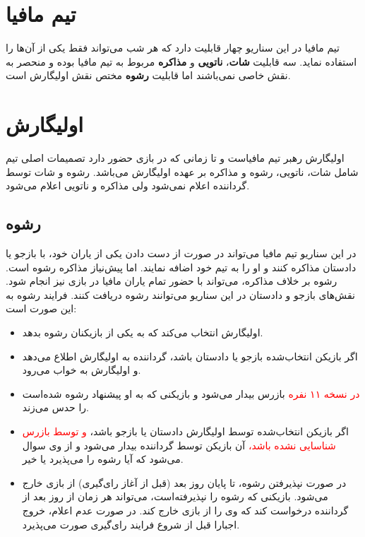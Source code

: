 \documentclass[12pt]{extarticle}
\begin{document}
\clearpage
{}

\section*{تیم مافیا}
تیم مافیا در این سناریو چهار قابلیت دارد که هر شب می‌تواند فقط یکی از آن‌ها را استفاده نماید. سه قابلیت
\textbf{شات}،
\textbf{ناتویی}
و
\textbf{مذاکره}
مربوط به تیم مافیا بوده و منحصر به نقش خاصی نمی‌باشند اما قابلیت
\textbf{رشوه}
مختص نقش اولیگارش است.

\section{اولیگارش}
اولیگارش رهبر تیم مافیاست و تا زمانی که در بازی حضور دارد تصمیمات اصلی تیم شامل شات، ناتویی، رشوه و مذاکره بر عهده اولیگارش می‌باشد.
رشوه و شات توسط گرداننده اعلام نمی‌شود ولی مذاکره و ناتویی اعلام می‌شود.

\subsection{رشوه}
در این سناریو تیم مافیا می‌تواند در صورت از دست دادن یکی از یاران خود، با بازجو یا دادستان مذاکره کنند و او را به تیم خود اضافه نمایند. اما پیش‌نیاز مذاکره‌ رشوه است. رشوه بر خلاف مذاکره، می‌تواند با حضور تمام یاران مافیا در بازی نیز انجام شود. نقش‌های بازجو و دادستان در این سناریو می‌توانند رشوه دریافت کنند. فرایند رشوه به این صورت است:
\begin{itemize}
	\item
	      اولیگارش انتخاب می‌کند که به یکی از بازیکنان رشوه بدهد.
	\item
	      اگر بازیکن انتخاب‌شده بازجو یا دادستان باشد، گرداننده به اولیگارش اطلاع می‌دهد و اولیگارش به خواب می‌رود.
	\item
	      \textcolor{red}{
		      در نسخه ۱۱ نفره
	      }
	      بازرس بیدار می‌شود و بازیکنی که به او پیشنهاد رشوه شده‌است را حدس می‌زند.
	\item
	      اگر بازیکن انتخاب‌شده توسط اولیگارش دادستان یا بازجو باشد،
	      \textcolor{red}{
		      و توسط بازرس شناسایی نشده باشد،
	      }
	      آن بازیکن توسط گرداننده بیدار می‌شود و از وی سوال می‌شود که آیا رشوه را می‌پذیرد یا خیر.
	\item
	      در صورت نپذیرفتن رشوه، تا پایان روز بعد (قبل از آغاز رای‌گیری) از بازی خارج می‌شود. بازیکنی که رشوه را نپذیرفته‌است، می‌تواند هر زمان از روز بعد از گرداننده درخواست کند که وی را از بازی خارج کند. در صورت عدم اعلام، خروج اجبارا قبل از شروع فرایند رای‌گیری صورت می‌پذیرد.
\end{itemize}
\end{document}
